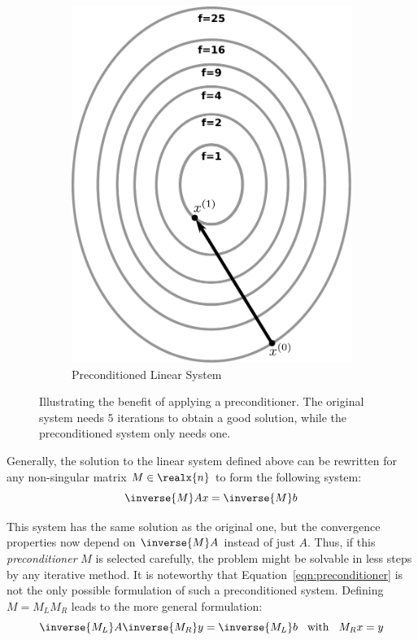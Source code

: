 \begin{figure}
\begin{subfigure}{.5\textwidth}
  \includegraphics[width=\linewidth]{figures/preconditioner.pdf}
  \caption{Preconditioned Linear System}
  \label{fig:preconditioner}
\end{subfigure}
\caption[Preconditioner]{Illustrating the benefit of applying a preconditioner. The original system needs 5 iterations to obtain a good solution, while the preconditioned system only needs one.}
\label{fig:preconditioning}
\end{figure}

Generally, the solution to the linear system defined above can be rewritten for any non-singular matrix $M \in \realx{n}$ to form the following system:
\begin{equation}
\label{eqn:preconditioner}
    \inverse
    {M}Ax = \inverse{M}b
\end{equation}

\noindent This system has the same solution as the original one, but the convergence properties now depend on $\inverse{M}A$ instead of just $A$. Thus, if this \textit{preconditioner} $M$ is selected carefully, the problem might be solvable in less steps by any iterative method. It is noteworthy that Equation~\hyperref[eqn:preconditioner]{\ref{eqn:preconditioner}} is not the only possible formulation of such a preconditioned system. Defining $M=M_LM_R$ leads to the more general formulation:
\begin{equation}
    \inverse{M_L}A\inverse{M_R}y = \inverse{M_L}b\;\; \text{ with }\;\; M_Rx=y
\end{equation}

